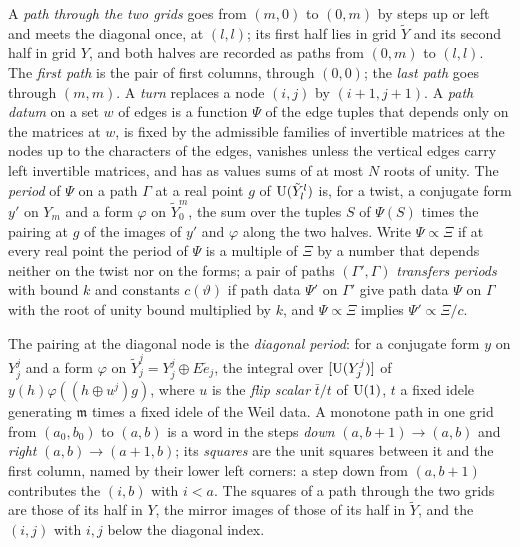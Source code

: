 A \emph{path through the two grids} goes from $(m,0)$ to $(0,m)$ by steps up or left and meets the diagonal once, at $(l,l)$; its first half lies in grid $\tilde Y$ and its second half in grid $Y$, and both
halves are recorded as paths from $(0,m)$ to $(l,l)$. The \emph{first path} is the pair of first columns, through $(0,0)$; the \emph{last path} goes through $(m,m)$. A \emph{turn} replaces a node $(i,j)$ by
$(i+1,j+1)$. A \emph{path datum} on a set $w$ of edges is a function $\Psi$ of the edge tuples that depends only on the matrices at $w$, is fixed by the admissible families of invertible matrices at the nodes
up to the characters of the edges, vanishes unless the vertical edges carry left invertible matrices, and has as values sums of at most $N$ roots of unity. The \emph{period} of $\Psi$ on a path $\Gamma$ at a
real point $g$ of $\operatorname{U}(\tilde Y^l_l)$ is, for a twist, a conjugate form $y'$ on $Y_m$ and a form $\varphi$ on $\tilde Y^m_0$, the sum over the tuples $S$ of $\Psi(S)$ times the pairing at $g$ of the images of $y'$ and
$\varphi$ along the two halves. Write $\Psi\propto\Xi$ if at every real point the period of $\Psi$ is a multiple of $\Xi$ by a number that depends neither on the twist nor on the forms; a pair of paths
$(\Gamma',\Gamma)$ \emph{transfers periods} with bound $k$ and constants $c(\vartheta)$ if path data $\Psi'$ on $\Gamma'$ give path data $\Psi$ on $\Gamma$ with the root of unity bound multiplied by $k$, and $\Psi\propto\Xi$
implies $\Psi'\propto\Xi/c$.

The pairing at the diagonal node is the \emph{diagonal period}: for a conjugate form $y$ on $Y^j_j$ and a form $\varphi$ on $\tilde Y^j_j=Y^j_j\oplus E\tilde e_j$, the integral over $[\operatorname{U}(Y^j_j)]$ of $y(h)\varphi((h\oplus u^j)g)$, where $u$ is the
\emph{flip scalar} $\bar t/t$ of $\operatorname{U}(1)$, $t$ a fixed idele generating $\mathfrak m$ times a fixed idele of the Weil data. A monotone path in one grid from $(a_0,b_0)$ to $(a,b)$ is a word in the steps \emph{down}
$(a,b+1)\to(a,b)$ and \emph{right} $(a,b)\to(a+1,b)$; its \emph{squares} are the unit squares between it and the first column, named by their lower left corners: a step down from $(a,b+1)$ contributes the $(i,b)$
with $i<a$. The squares of a path through the two grids are those of its half in $Y$, the mirror images of those of its half in $\tilde Y$, and the $(i,j)$ with $i,j$ below the diagonal index.

